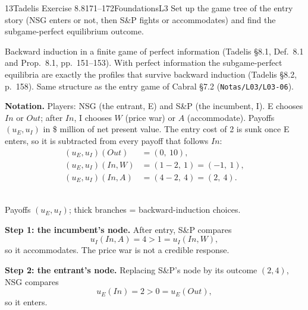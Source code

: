 \begin{exsol}{13}{Tadelis Exercise 8.8}{171--172}{Foundations}{L3}
\asked Set up the game tree of the entry story (NSG enters or not, then S\&P fights or
accommodates) and find the subgame-perfect equilibrium outcome.

\method Backward induction in a finite game of perfect information (Tadelis \S8.1,
Def.~8.1 and Prop.~8.1, pp.~151--153). With perfect information the subgame-perfect equilibria
are exactly the profiles that survive backward induction (Tadelis \S8.2, p.~158). Same structure
as the entry game of Cabral \S7.2 (\texttt{Notas/L03/L03-06}).

\solution
\textbf{Notation.} Players: NSG (the entrant, E) and S\&P (the incumbent, I). E chooses
$\mathit{In}$ or $\mathit{Out}$; after $\mathit{In}$, I chooses $W$ (price war) or $A$
(accommodate). Payoffs $(u_E, u_I)$ in \$ million of net present value. The entry cost of 2 is
sunk once E enters, so it is subtracted from every payoff that follows $\mathit{In}$:
\begin{align*}
  (u_E,u_I)(\mathit{Out}) &= (0,\ 10),\\
  (u_E,u_I)(\mathit{In},W) &= (1-2,\ 1) = (-1,\ 1),\\
  (u_E,u_I)(\mathit{In},A) &= (4-2,\ 4) = (2,\ 4).
\end{align*}
\begin{center}
\\[2pt]
{\footnotesize Payoffs $(u_E, u_I)$; thick branches = backward-induction choices.}
\end{center}

\textbf{Step 1: the incumbent's node.} After entry, S\&P compares
\[
  u_I(\mathit{In},A) = 4 > 1 = u_I(\mathit{In},W),
\]
so it accommodates. The price war is not a credible response.

\textbf{Step 2: the entrant's node.} Replacing S\&P's node by its outcome $(2,4)$, NSG compares
\[
  u_E(\mathit{In}) = 2 > 0 = u_E(\mathit{Out}),
\]
so it enters.


\end{exsol}
